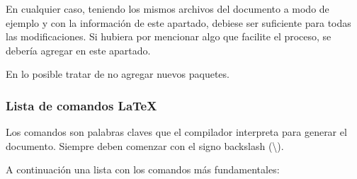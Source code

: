 En cualquier caso, teniendo los mismos archivos  del documento a modo de ejemplo y con la información de este apartado, debiese ser suficiente para todas las modificaciones. Si hubiera por mencionar algo que facilite el proceso, se debería agregar en este apartado.

En lo posible tratar de no agregar nuevos paquetes.

\subsubsection{Lista de comandos LaTeX}\label{flujo:listado-comandos-latex}
Los comandos son palabras claves que el compilador interpreta para generar el documento. Siempre deben comenzar con el signo backslash (\textbackslash).

\noindent A continuación una lista con los comandos más fundamentales:

